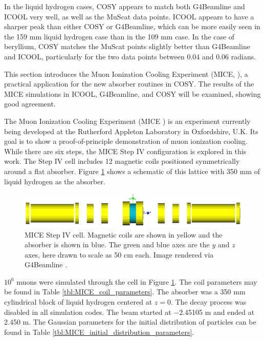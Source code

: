 In the liquid hydrogen cases, COSY appears to match both G4Beamline and ICOOL very well, as well as the MuScat data points. ICOOL appears to have a sharper peak than either COSY or G4Beamline, which can be more easily seen in the 159 mm liquid hydrogen case than in the 109 mm case. In the case of beryllium, COSY matches the MuScat points slightly better than G4Beamline and ICOOL, particularly for the two data points between 0.04 and 0.06 radians.

\label{sec:mice}

This section introduces the Muon Ionization Cooling Experiment (MICE, \cite{mice}), a practical application for the new absorber routines in COSY. The results of the MICE simulations in ICOOL, G4Beamline, and COSY will be examined, showing good agreement.

\label{ssc:miceIntro}
The Muon Ionization Cooling Experiment (MICE \cite{mice}) is an experiment currently being developed at the Rutherford Appleton Laboratory in Oxfordshire, U.K. Its goal is to show a proof-of-principle demonstration of muon ionization cooling. While there are six steps, the MICE Step IV configuration is explored in this work. The Step IV cell includes 12 magnetic coils positioned symmetrically around a flat absorber. Figure \ref{fig:miceStepIV} shows a schematic of this lattice with 350 mm of liquid hydrogen as the absorber.
\begin{figure}[h!]
  \centering
    \includegraphics[width=\textwidth]{Figures/miceStepIV} 
  \caption[MICE Step IV cell.]{MICE Step IV cell. Magnetic coils are shown in yellow and the absorber is shown in blue. The green and blue axes are the $y$ and $z$ axes, here drawn to scale as 50 cm each. Image rendered via G4Beamline \cite{g4bl}.}
  \label{fig:miceStepIV}
\end{figure}

\label{ssc:miceResults}
$10^6$ muons were simulated through the cell in Figure \ref{fig:miceStepIV}. The coil parameters may be found in Table \ref{tbl:MICE_coil_parameters}. The absorber was a 350 mm cylindrical block of liquid hydrogen centered at $z=0$. The decay process was disabled in all simulation codes. The beam started at $-$2.45105 m and ended at 2.450 m. The Gaussian parameters for the initial distribution of particles can be found in Table \ref{tbl:MICE_initial_distribution_parameters}.

